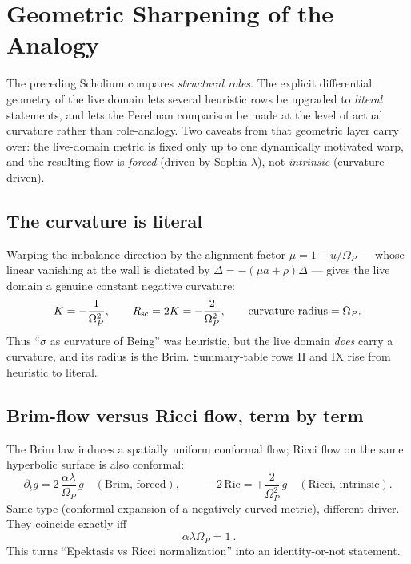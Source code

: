 \documentclass[11pt]{article}
\newcommand{\Om}{\Omega_P}
\begin{document}
\section{Geometric Sharpening of the Analogy}

The preceding Scholium compares \emph{structural roles}. The explicit differential geometry of the live domain lets several heuristic rows be upgraded to \emph{literal} statements, and lets the Perelman comparison be made at the level of actual curvature rather than role-analogy. Two caveats from that geometric layer carry over: the live-domain metric is fixed only up to one dynamically motivated warp, and the resulting flow is \emph{forced} (driven by Sophia $\lambda$), not \emph{intrinsic} (curvature-driven).

\subsection{The curvature is literal}

Warping the imbalance direction by the alignment factor $\mu=1-u/\Om$ --- whose linear vanishing at the wall is dictated by $\dot\Delta=-(\mu a+\rho)\Delta$ --- gives the live domain a genuine constant negative curvature:
\begin{equation}
K=-\frac{1}{\Om^{2}},
\qquad
R_{\rm sc}=2K=-\frac{2}{\Om^{2}},
\qquad
\text{curvature radius}=\Om.
\end{equation}
Thus ``$\sigma$ as curvature of Being'' was heuristic, but the live domain \emph{does} carry a curvature, and its radius is the Brim. Summary-table rows II and IX rise from heuristic to literal.

\subsection{Brim-flow versus Ricci flow, term by term}

The Brim law induces a spatially uniform conformal flow; Ricci flow on the same hyperbolic surface is also conformal:
\begin{equation}
\partial_t g=2\,\frac{\alpha\lambda}{\Om}\,g\quad(\text{Brim, forced}),
\qquad
-2\,\mathrm{Ric}=+\frac{2}{\Om^{2}}\,g\quad(\text{Ricci, intrinsic}).
\end{equation}
Same type (conformal expansion of a negatively curved metric), different driver. They coincide exactly iff
\begin{equation}
\boxed{\ \alpha\lambda\Om=1\ }.
\end{equation}
This turns ``Epektasis vs Ricci normalization'' into an identity-or-not statement.
\end{document}
